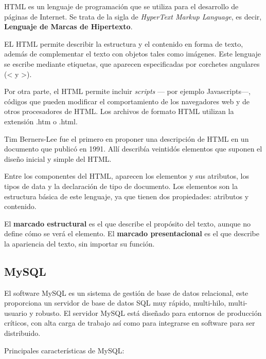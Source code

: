     HTML es un lenguaje de programación que se utiliza para el desarrollo de páginas de Internet. Se trata de la sigla de {\it HyperText Markup Language}, es decir, {\bf Lenguaje de Marcas de Hipertexto}.

    EL HTML permite describir la estructura y el contenido en forma de texto, además de complementar el texto con objetos tales como imágenes. Este lenguaje se escribe mediante etiquetas, que aparecen especificadas por corchetes angulares (< y >).

    Por otra parte, el HTML permite incluir {\it scripts} --- por ejemplo Javascripts---, códigos que pueden modificar el comportamiento de los navegadores web y de otros procesadores de HTML. Los archivos de formato HTML utilizan la extensión .htm o .html.

    Tim Berners-Lee fue el primero en proponer una descripción de HTML en un documento que publicó en 1991. Allí describía veintidós elementos que suponen el diseño inicial y simple del HTML.

    Entre los componentes del HTML, aparecen los elementos y sus atributos, los tipos de data y la declaración de tipo de documento. Los elementos son la estructura básica de este lenguaje, ya que tienen dos propiedades: atributos y contenido.

    El {\bf marcado estructural} es el que describe el propósito del texto, aunque no define cómo se verá el elemento. El {\bf marcado presentacional} es el que describe la apariencia del texto, sin importar su función.
    
  
  \subsection{MySQL} %
    \label{sub:tec_mysql}
    
    El software MySQL es un sistema de gestión de base de datos relacional, este proporciona un servidor de base de datos SQL muy rápido, multi-hilo, multi-usuario y robusto. El servidor MySQL está diseñado para entornos de producción críticos, con alta carga de trabajo así como para integrarse en software para ser distribuido.
    
    Principales características de MySQL:
    
